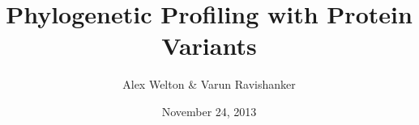 \documentclass[11pt, oneside]{article}
\title{Phylogenetic Profiling with Protein Variants}
\author{Alex Welton & Varun Ravishanker}
\date{November 24, 2013}
\begin{document}
\maketitle
\pagebreak
\end{document}

